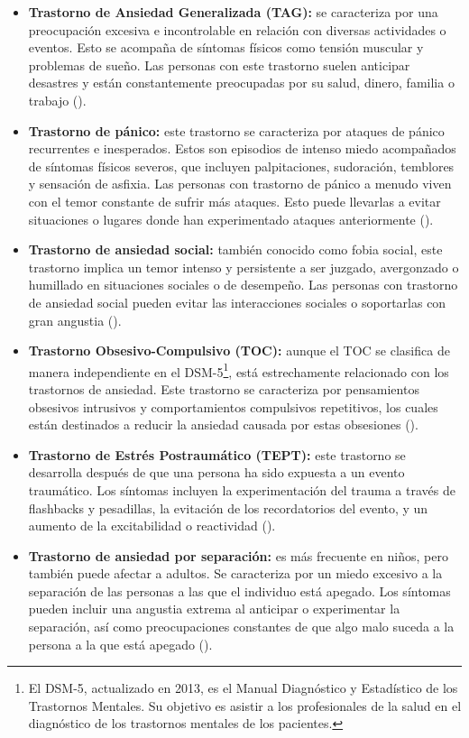 \begin{itemize}
	\item \textbf{Trastorno de Ansiedad Generalizada (TAG):} se caracteriza por una preocupación excesiva e incontrolable en relación con diversas actividades o eventos. Esto se acompaña de síntomas físicos como tensión muscular y problemas de sueño. Las personas con este trastorno suelen anticipar desastres y están constantemente preocupadas por su salud, dinero, familia o trabajo (\cite{APA:2013}).
	\item \textbf{Trastorno de pánico:} este trastorno se caracteriza por ataques de pánico recurrentes e inesperados. Estos son episodios de intenso miedo acompañados de síntomas físicos severos, que incluyen palpitaciones, sudoración, temblores y sensación de asfixia. Las personas con trastorno de pánico a menudo viven con el temor constante de sufrir más ataques. Esto puede llevarlas a evitar situaciones o lugares donde han experimentado ataques anteriormente (\cite{KESSLER:2005}).
	\item \textbf{Trastorno de ansiedad social:} también conocido como fobia social, este trastorno implica un temor intenso y persistente a ser juzgado, avergonzado o humillado en situaciones sociales o de desempeño. Las personas con trastorno de ansiedad social pueden evitar las interacciones sociales o soportarlas con gran angustia (\cite{STEIN:2008}).
	\item \textbf{Trastorno Obsesivo-Compulsivo (TOC):} aunque el TOC se clasifica de manera independiente en el DSM-5\footnote{El DSM-5, actualizado en 2013, es el Manual Diagnóstico y Estadístico de los Trastornos Mentales. Su objetivo es asistir a los profesionales de la salud en el diagnóstico de los trastornos mentales de los pacientes.}, está estrechamente relacionado con los trastornos de ansiedad. Este trastorno se caracteriza por pensamientos obsesivos intrusivos y comportamientos compulsivos repetitivos, los cuales están destinados a reducir la ansiedad causada por estas obsesiones (\cite{APA:2013}).
	\item \textbf{Trastorno de Estrés Postraumático (TEPT):} este trastorno se desarrolla después de que una persona ha sido expuesta a un evento traumático. Los síntomas incluyen la experimentación del trauma a través de flashbacks y pesadillas, la evitación de los recordatorios del evento, y un aumento de la excitabilidad o reactividad (\cite{YEHUDA:2002}).
	\item \textbf{Trastorno de ansiedad por separación:} es más frecuente en niños, pero también puede afectar a adultos. Se caracteriza por un miedo excesivo a la separación de las personas a las que el individuo está apegado. Los síntomas pueden incluir una angustia extrema al anticipar o experimentar la separación, así como preocupaciones constantes de que algo malo suceda a la persona a la que está apegado (\cite{APA:2013}).

\end{itemize}
